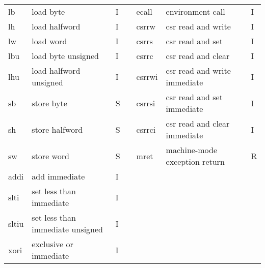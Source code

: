 \documentclass[../specifications.tex]{subfiles}
\begin{document}
\begin{table*}[t]
\begin{tabular}{|l|l|l|llll}
    lb    & load byte                             & I  & \multicolumn{1}{l|}{} & \multicolumn{1}{l|}{ecall}  & \multicolumn{1}{l|}{environment call}              & \multicolumn{1}{l|}{I}  \\
    lh    & load halfword                         & I  & \multicolumn{1}{l|}{} & \multicolumn{1}{l|}{csrrw}  & \multicolumn{1}{l|}{csr read and write}            & \multicolumn{1}{l|}{I}  \\
    lw    & load word                             & I  & \multicolumn{1}{l|}{} & \multicolumn{1}{l|}{csrrs}  & \multicolumn{1}{l|}{csr read and set}              & \multicolumn{1}{l|}{I}  \\
    lbu   & load byte unsigned                    & I  & \multicolumn{1}{l|}{} & \multicolumn{1}{l|}{csrrc}  & \multicolumn{1}{l|}{csr read and clear}            & \multicolumn{1}{l|}{I}  \\
    lhu   & load halfword unsigned                & I  & \multicolumn{1}{l|}{} & \multicolumn{1}{l|}{csrrwi} & \multicolumn{1}{l|}{csr read and write immediate}  & \multicolumn{1}{l|}{I}  \\
    sb    & store byte                            & S  & \multicolumn{1}{l|}{} & \multicolumn{1}{l|}{csrrsi} & \multicolumn{1}{l|}{csr read and set immediate}    & \multicolumn{1}{l|}{I}  \\
    sh    & store halfword                        & S  & \multicolumn{1}{l|}{} & \multicolumn{1}{l|}{csrrci} & \multicolumn{1}{l|}{csr read and clear immediate}  & \multicolumn{1}{l|}{I}  \\
    sw    & store word                            & S  & \multicolumn{1}{l|}{} & \multicolumn{1}{l|}{mret}   & \multicolumn{1}{l|}{machine-mode exception return} & \multicolumn{1}{l|}{R}  \\ \cline{5-7}
    addi  & add immediate                         & I  &                       &                             &                                                    &                         \\
    slti  & set less than immediate               & I  &                       &                             &                                                    &                         \\
    sltiu & set less than immediate unsigned      & I  &                       &                             &                                                    &                         \\
    xori  & exclusive or immediate                & I  &                       &                             &                                                    &                         \\

\end{tabular}
\end{table*}
\end{document}

